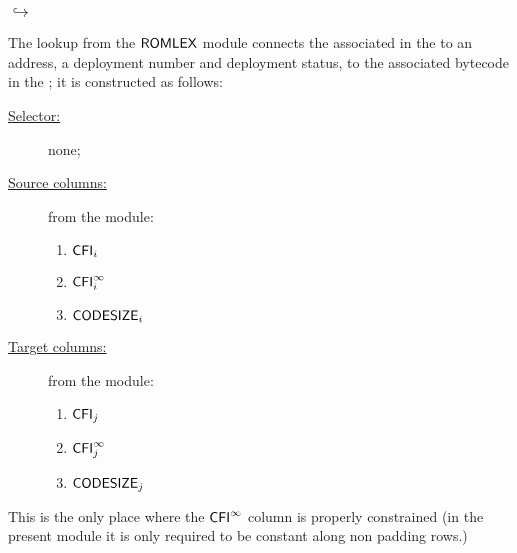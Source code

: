 \subsubsection{\romLexMod{} $\hookrightarrow$ \romMod{}}
The lookup from the $\textsf{ROMLEX}$ module connects the \CFI{} associated in the \romLexMod{} to an address, a deployment number and deployment status, to the associated bytecode in the \romMod{}; it is constructed as follows:
\begin{description}
	\item[\underline{Selector:}] none;
	\item[\underline{Source columns:}] from the \romLexMod{} module:
	\begin{multicols}{3}
	\begin{enumerate}
		\item $\textsf{CFI}_{i}$
		\item $\textsf{CFI}^\infty_{i}$
		\item $\textsf{CODESIZE}_{i}$
	\end{enumerate}
	\end{multicols}
\item[\underline{Target columns:}] from the \romMod{} module: 
	\begin{multicols}{3}
	\begin{enumerate}
		\item $\textsf{CFI}_{j}$
		\item $\textsf{CFI}^\infty_{j}$
		\item $\textsf{CODESIZE}_{j}$
	\end{enumerate} 
	\end{multicols}
\end{description}
\saNote{} This is the only place where the $\textsf{CFI}^\infty{}$ column is properly constrained (in the present module it is only required to be constant along non padding rows.) 
